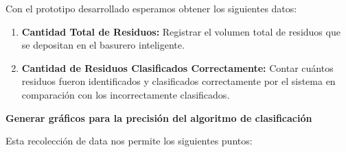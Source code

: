 Con el prototipo desarrollado esperamos obtener los siguientes datos:

\begin{enumerate}
    \item \textbf{Cantidad Total de Residuos:} Registrar el volumen total de residuos que se depositan en el basurero inteligente.
    \item \textbf{Cantidad de Residuos Clasificados Correctamente:} Contar cuántos residuos fueron identificados y clasificados correctamente por el sistema en comparación con los incorrectamente clasificados.
\end{enumerate}

\textbf{Generar gráficos para la precisión del algoritmo de clasificación}

Esta recolección de data nos permite los siguientes puntos:

